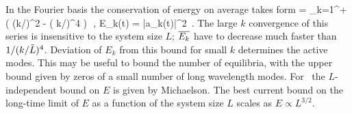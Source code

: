 In the Fourier basis  the conservation of energy on average
takes form
 = \sum_{k=1}^{+\infty} ( (k/\tildeL)^2 - ( k/\tildeL)^4 )\,
\,,\qquad
E_k(t) =  |a_k(t)|^2
\,.
The large $k$ convergence of this series is insensitive to the
system size $L$; $\overline{E_k}$ have to decrease much faster than
$1/( k/\tilde{L})^4$.
Deviation of $E_k$ from this bound for small $k$ determines the active modes.
This may be useful to bound the number of equilibria, with
the upper bound given by zeros of a small number
of long wavelength modes.
For \eqva\ the $L$-independent bound
    on $E$ is given by Michaelson. 
The best current bound\cite{GiacoOtto05,bronski-2005} on the long-time limit
of $E$
as a function of the system size $L$ scales as 
$E \propto L^{3/2}$.
%


